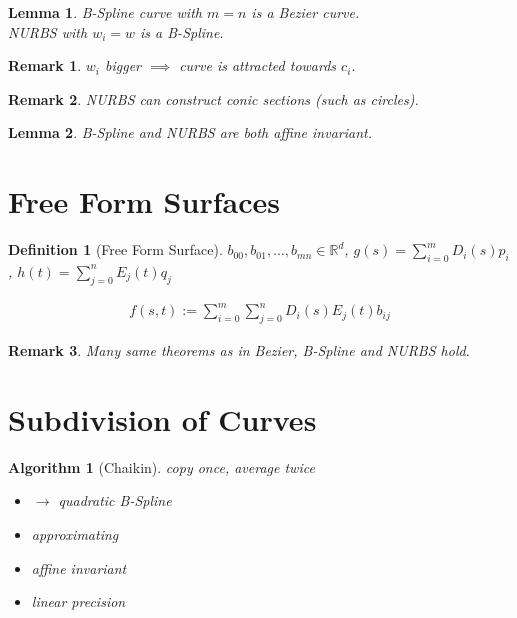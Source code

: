 \documentclass[conference]{IEEEtran}
\newtheorem{algorithm}{Algorithm}
\newtheorem{definition}{Definition}
\newtheorem{lemma}{Lemma}
\newtheorem{remark}{Remark}
\begin{document}
\begin{lemma}
	B-Spline curve with $m=n$ is a Bezier curve.\\
	NURBS with $w_i = w$ is a B-Spline.
\end{lemma}

\begin{remark}
	$w_i$ bigger $\implies$ curve is attracted towards $c_i$.
\end{remark}

\begin{remark}
	NURBS can construct conic sections (such as circles).
\end{remark}

\begin{lemma}
	B-Spline and NURBS are both affine invariant.
\end{lemma}

\section{Free Form Surfaces}

\begin{definition}[Free Form Surface]
	$b_{00}, b_{01}, ..., b_{mn} \in \mathbb{R}^d$, $g(s) = \sum_{i=0}^{m} D_i(s) p_i$, $h(t) = \sum_{j=0}^{n} E_j(t) q_j$
	
	\begin{align*}
		f(s,t) := \sum_{i=0}^{m} \sum_{j=0}^{n} D_i(s) E_j(t) b_{ij}
	\end{align*}
\end{definition}

\begin{remark}
	Many same theorems as in Bezier, B-Spline and NURBS hold.
\end{remark}

\section{Subdivision of Curves}

\begin{algorithm}[Chaikin]
	copy once, average twice
	
	
	\begin{itemize}
		\item $\rightarrow$ quadratic B-Spline
		\item approximating
		\item affine invariant
		\item linear precision
	\end{itemize}
\end{algorithm}
\end{document}
